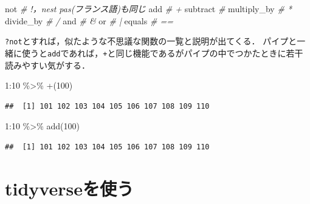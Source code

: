 \documentclass[
]{article}
\newenvironment{Shaded}{\begin{snugshade}}{\end{snugshade}}
\newcommand{\AttributeTok}[1]{\textcolor[rgb]{0.77,0.63,0.00}{#1}}
\newcommand{\CommentTok}[1]{\textcolor[rgb]{0.56,0.35,0.01}{\textit{#1}}}
\newcommand{\DecValTok}[1]{\textcolor[rgb]{0.00,0.00,0.81}{#1}}
\newcommand{\FunctionTok}[1]{\textcolor[rgb]{0.00,0.00,0.00}{#1}}
\newcommand{\NormalTok}[1]{#1}
\newcommand{\SpecialCharTok}[1]{\textcolor[rgb]{0.00,0.00,0.00}{#1}}
\newcommand{\StringTok}[1]{\textcolor[rgb]{0.31,0.60,0.02}{#1}}
\begin{document}
\begin{Shaded}
\begin{Highlighting}[]
\NormalTok{not          }\CommentTok{\# \textasciigrave{}!\textasciigrave{}，\textasciigrave{}n\textquotesingle{}est pas\textasciigrave{}(フランス語)も同じ}
\NormalTok{add          }\CommentTok{\# \textasciigrave{}+\textasciigrave{}}
\NormalTok{subtract     }\CommentTok{\# \textasciigrave{}{-}\textasciigrave{}}
\NormalTok{multiply\_by  }\CommentTok{\# \textasciigrave{}*\textasciigrave{}}
\NormalTok{divide\_by    }\CommentTok{\# \textasciigrave{}/\textasciigrave{}}
\NormalTok{and          }\CommentTok{\# \textasciigrave{}\&\textasciigrave{}}
\NormalTok{or           }\CommentTok{\# \textasciigrave{}|\textasciigrave{}}
\NormalTok{equals       }\CommentTok{\# \textasciigrave{}==\textasciigrave{}}
\end{Highlighting}
\end{Shaded}

\texttt{?not}とすれば，似たような不思議な関数の一覧と説明が出てくる．
パイプと一緒に使うと\texttt{add}であれば，\texttt{+}と同じ機能であるがパイプの中でつかたときに若干読みやすい気がする．

\begin{Shaded}
\begin{Highlighting}[]
\DecValTok{1}\SpecialCharTok{:}\DecValTok{10} \SpecialCharTok{\%\textgreater{}\%} \StringTok{\textasciigrave{}}\AttributeTok{+}\StringTok{\textasciigrave{}}\NormalTok{(}\DecValTok{100}\NormalTok{)}
\end{Highlighting}
\end{Shaded}

\begin{verbatim}
##  [1] 101 102 103 104 105 106 107 108 109 110
\end{verbatim}

\begin{Shaded}
\begin{Highlighting}[]
\DecValTok{1}\SpecialCharTok{:}\DecValTok{10} \SpecialCharTok{\%\textgreater{}\%} \FunctionTok{add}\NormalTok{(}\DecValTok{100}\NormalTok{)}
\end{Highlighting}
\end{Shaded}

\begin{verbatim}
##  [1] 101 102 103 104 105 106 107 108 109 110
\end{verbatim}

\hypertarget{tidyverse}{%
\section{tidyverseを使う}\label{tidyverse}}
\end{document}
